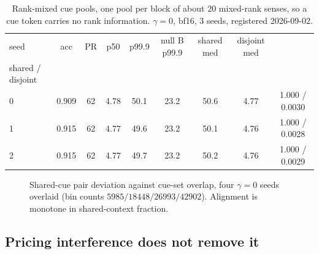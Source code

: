 \documentclass{article}
\newcommand{\degr}{^{\circ}}
\begin{document}
\begin{table}[t]
  \centering\footnotesize
  \caption{Rank-mixed cue pools, one pool per block of about $20$ mixed-rank senses,
    so a cue token carries no rank information. $\gamma{=}0$, bf16, 3 seeds,
  registered 2026-09-02.}
  \label{tab:mixed}
  \renewcommand{\arraystretch}{1.1}
  \setlength{\tabcolsep}{3.4pt}
  \begin{tabular}{@{}lcccccccc@{}}
    \toprule
    seed & acc & PR & p50 & p99.9 & null B p99.9 & shared med & disjoint med &
    \makecell{$P(\text{dev}{>}21\degr)$\\shared / disjoint} \\
    \midrule
    0 & 0.909 & 62 & 4.78 & 50.1 & 23.2 & 50.6 & 4.77 & 1.000 / 0.0030 \\
    1 & 0.915 & 62 & 4.77 & 49.6 & 23.2 & 50.1 & 4.76 & 1.000 / 0.0028 \\
    2 & 0.915 & 62 & 4.77 & 49.7 & 23.2 & 50.2 & 4.76 & 1.000 / 0.0029 \\
    \bottomrule
  \end{tabular}
\end{table}

\begin{figure}[t]
  \centering
  \caption{Shared-cue pair deviation against cue-set overlap, four $\gamma{=}0$ seeds
    overlaid (bin counts $5985/18448/26993/42902$). Alignment is monotone in
  shared-context fraction.}
  \label{fig:jac}
\end{figure}

\subsection{Pricing interference does not remove it}\label{sec:price}
\end{document}
